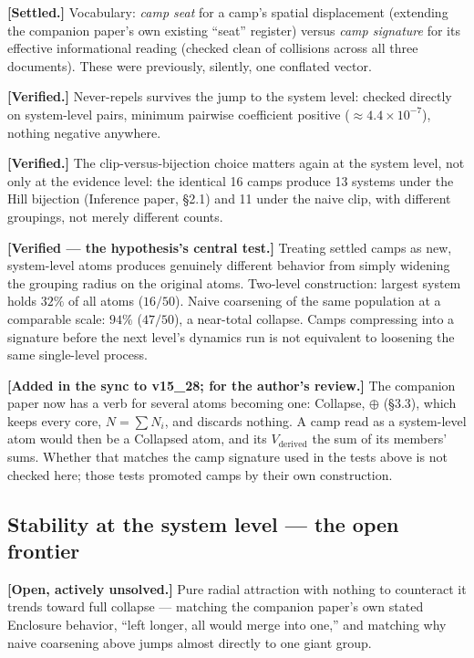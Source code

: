 \documentclass[12pt, a4paper]{article}
\begin{document}
\textbf{[Settled.]} Vocabulary: \emph{camp seat} for a camp's spatial
displacement (extending the companion paper's own existing ``seat''
register) versus \emph{camp signature} for its effective
informational reading (checked clean of collisions across all three
documents). These were previously, silently, one conflated vector.

\textbf{[Verified.]} Never-repels survives the jump to the system
level: checked directly on system-level pairs, minimum pairwise
coefficient positive ($\approx4.4\times10^{-7}$), nothing negative
anywhere.

\textbf{[Verified.]} The clip-versus-bijection choice matters again
at the system level, not only at the evidence level: the identical
16 camps produce 13 systems under the Hill bijection (Inference paper, \S2.1) and 11 under the naive clip, with different groupings, not merely different
counts.

\textbf{[Verified --- the hypothesis's central test.]} Treating
settled camps as new, system-level atoms produces genuinely different
behavior from simply widening the grouping radius on the original
atoms. Two-level construction: largest system holds $32\%$ of all
atoms ($16/50$). Naive coarsening of the same population at a
comparable scale: $94\%$ ($47/50$), a near-total collapse. Camps
compressing into a signature before the next level's dynamics run is not equivalent to loosening the same single-level process.

\textbf{[Added in the sync to v15\_28; for the author's review.]} The
companion paper now has a verb for several atoms becoming one:
Collapse, $\oplus$ (\S3.3), which keeps every core, $N=\sum N_i$, and
discards nothing. A camp read as a system-level atom would then be a
Collapsed atom, and its $V_{\mathrm{derived}}$ the sum of its members'
sums. Whether that matches the camp signature used in the tests above
is not checked here; those tests promoted camps by their own
construction.

\subsection*{Stability at the system level --- the open frontier}

\textbf{[Open, actively unsolved.]} Pure radial attraction with
nothing to counteract it trends toward full collapse --- matching the
companion paper's own stated Enclosure behavior, ``left longer, all
would merge into one,'' and matching why naive coarsening above jumps
almost directly to one giant group.
\end{document}
